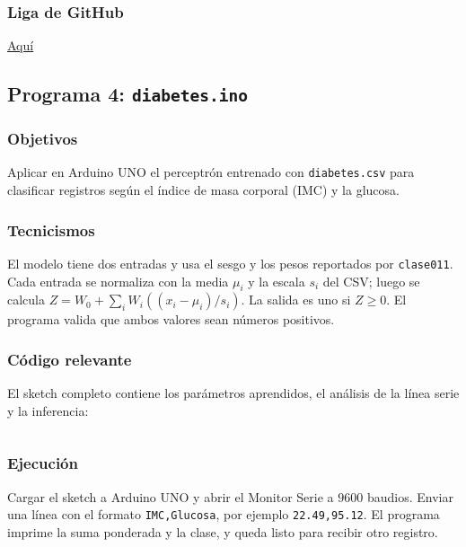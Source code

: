\documentclass{article}[12pt,a4paper]
\begin{document}
\subsubsection{Liga de \textbf{GitHub}}

\href{https://github.com/MarcosHCK/master-programming/tree/master/clase011}{Aquí \faGithubSquare}

\subsection{Programa 4: \texttt{diabetes.ino}}

\subsubsection{Objetivos}

Aplicar en Arduino UNO el perceptrón entrenado con \texttt{diabetes.csv} para
clasificar registros según el índice de masa corporal (IMC) y la glucosa.

\subsubsection{Tecnicismos}

El modelo tiene dos entradas y usa el sesgo y los pesos reportados por
\texttt{clase011}. Cada entrada se normaliza con la media \(\mu_i\) y la escala
\(s_i\) del CSV; luego se calcula \(Z=W_0+\sum_i W_i((x_i-\mu_i)/s_i)\). La
salida es uno si \(Z\geq0\). El programa valida que ambos valores sean números
positivos.

\subsubsection{Código relevante}

El sketch completo contiene los parámetros aprendidos, el análisis de la línea
serie y la inferencia:

\inputminted{cpp}{../clase011/diabetes.ino}

\subsubsection{Ejecución}

Cargar el sketch a Arduino UNO y abrir el Monitor Serie a \(9600\) baudios.
Enviar una línea con el formato \texttt{IMC,Glucosa}, por ejemplo
\texttt{22.49,95.12}. El programa imprime la suma ponderada y la clase, y queda
listo para recibir otro registro.
\end{document}
